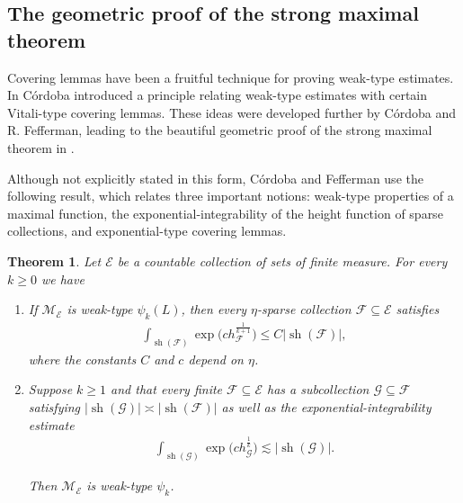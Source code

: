 \documentclass[oneside]{amsart}
\newtheorem{theorem}{Theorem}
\theoremstyle{definition}
\theoremstyle{plain}
\numberwithin{equation}{section}
\numberwithin{theorem}{section}
\newcommand{\sh}{\operatorname{sh}}
\begin{document}
\subsection{The geometric proof of the strong maximal theorem}

Covering lemmas have been a fruitful technique for proving weak-type estimates.
In \cite{Cordoba1975} Córdoba introduced a principle relating weak-type
estimates with certain Vitali-type covering lemmas.
These ideas were developed further by Córdoba and R. Fefferman, leading to the
beautiful geometric proof of the strong maximal theorem in
\cite{CordobaFefferman1975}.

Although not explicitly stated in this form, Córdoba and Fefferman use
the following result, which relates three important notions:
weak-type properties of a maximal function,
the exponential-integrability of the height function of sparse collections,
and exponential-type covering lemmas.
\begin{theorem} \label{CF:Weak-type|SparseExpInt|Covering}
  Let $\mathcal{E}$ be a countable collection of sets of finite measure.
  For every $k \geq 0$ we have
  \begin{enumerate}[label=(\alph*)]
    \item If $\mathcal{M}_{\mathcal{E}}$ is weak-type $\psi_k(L)$, then
      every $\eta$-sparse collection $\mathcal{F} \subseteq \mathcal{E}$
      satisfies
      \begin{align*}
        \int_{\sh(\mathcal{F})} \exp\Big(c h_{\mathcal{F}}^{\frac{1}{k+1}}\Big)
        \leq C |\sh(\mathcal{F})|,
      \end{align*}
      where the constants $C$ and $c$ depend on $\eta$.

    \item Suppose $k \geq 1$ and that every finite
      $\mathcal{F} \subseteq \mathcal{E}$ has a subcollection
      $\mathcal{G} \subseteq \mathcal{F}$ satisfying
      $|\sh(\mathcal{G})| \asymp |\sh(\mathcal{F})|$ as well as the
      exponential-integrability estimate
      \begin{align*}
        \int_{\sh(\mathcal{G})} \exp\Big(c h_{\mathcal{G}}^{\frac{1}{k}}\Big)
        \lesssim |\sh(\mathcal{G})|.
      \end{align*}

      Then $\mathcal{M}_{\mathcal{E}}$ is weak-type $\psi_{k}$.
  \end{enumerate}
\end{theorem}
\end{document}
